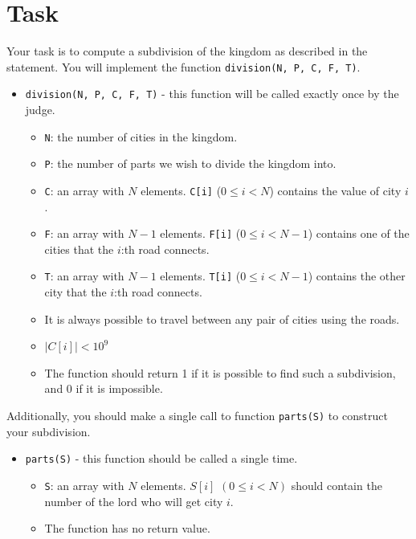 \section*{Task}
Your task is to compute a subdivision of the kingdom as described in the statement. You will implement the function \texttt{division(N, P, C, F, T)}.

\begin{itemize}
  \item \texttt{division(N, P, C, F, T)} - this function will be called exactly once by the judge.
  \begin{itemize}
    \item \texttt{N}: the number of cities in the kingdom.
    \item \texttt{P}: the number of parts we wish to divide the kingdom into.
    \item \texttt{C}: an array with $N$ elements. \texttt{C[i]} ($0 \le i < N$) contains the value of city $i$.
    \item \texttt{F}: an array with $N - 1$ elements. \texttt{F[i]} ($0 \le i < N - 1$) contains one of the cities that the $i$:th road connects.
    \item \texttt{T}: an array with $N - 1$ elements. \texttt{T[i]} ($0 \le i < N - 1$) contains the other city that the $i$:th road connects.
    \item It is always possible to travel between any pair of cities using the roads.
    \item $|C[i]| < 10^9$
    \item The function should return 1 if it is possible to find such a subdivision,
      and 0 if it is impossible.
  \end{itemize}
\end{itemize}

Additionally, you should make a single call to function \texttt{parts(S)} to construct your subdivision.
\begin{itemize}
  \item \texttt{parts(S)} - this function should be called a single time.
  \begin{itemize}
    \item \texttt{S}: an array with $N$ elements. $S[i]$ $(0 \le i < N)$ should contain the number of the lord who will get city $i$.
    \item The function has no return value.
  \end{itemize}
\end{itemize}

